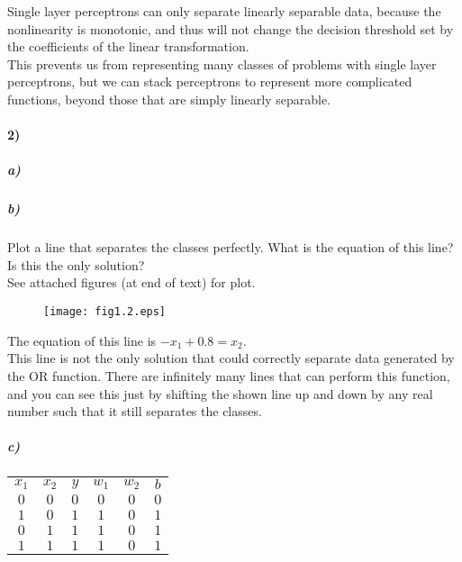 \documentclass[10pt,letter]{article}
\begin{document}
Single layer perceptrons can only separate linearly separable data, because the nonlinearity is 
monotonic, and thus will not change the decision threshold set by the coefficients of the linear 
transformation.\\

This prevents us from representing many classes of problems with single layer perceptrons, but 
we can stack perceptrons to represent more complicated functions, beyond those that are simply 
linearly separable.

\paragraph{2)}

\subparagraph{a)}
\subparagraph{b)} Plot a line that separates the classes perfectly.  What is the equation of this 
line? Is this the only solution?\\

See attached figures (at end of text) for plot.\\
\begin{figure}[b]
\vspace*{-1cm}
\centering
\texttt{[image: fig1.2.eps]}
\end{figure}

The equation of this line is $-x_1 + 0.8 = x_2$.\\

This line is not the only solution that could correctly separate data generated by the OR function.  There are infinitely many lines that can perform this function, and you can see this just by shifting the shown line up and down by any real number such that it still separates the classes.

\subparagraph{c)}

\begin{center}
    \begin{tabular}{ |c|c|c|c|c|c| } 
         \hline
          $x_1$ & $x_2$ & $y$ & $w_1$ & $w_2$ & $b$\\ 
          $0$ & $0$ & $0$ & $0$ & $0$ & $0$\\ 
          $1$ & $0$ & $1$ & $1$ & $0$ & $1$\\ 
          $0$ & $1$ & $1$ & $1$ & $0$ & $1$\\ 
          $1$ & $1$ & $1$ & $1$ & $0$ & $1$\\ 
          \hline
      \end{tabular}
  \end{center}
\end{document}
